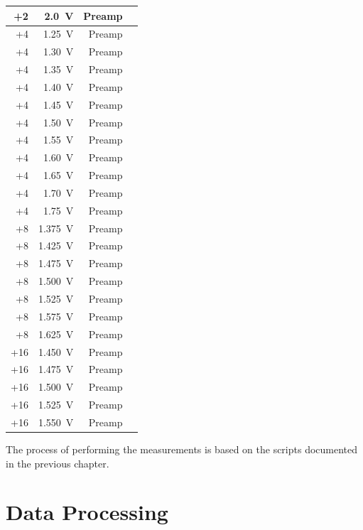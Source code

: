 \begin{table}
\begin{tabular}{rrrr}
        +2 & \SI{2.0}{\volt} & Preamp \\
        \midrule
        +4 & \SI{1.25}{\volt} & Preamp \\
        +4 & \SI{1.30}{\volt} & Preamp \\
        +4 & \SI{1.35}{\volt} & Preamp \\
        +4 & \SI{1.40}{\volt} & Preamp \\
        +4 & \SI{1.45}{\volt} & Preamp \\
        +4 & \SI{1.50}{\volt} & Preamp \\
        +4 & \SI{1.55}{\volt} & Preamp \\
        +4 & \SI{1.60}{\volt} & Preamp \\
        +4 & \SI{1.65}{\volt} & Preamp \\
        +4 & \SI{1.70}{\volt} & Preamp \\
        +4 & \SI{1.75}{\volt} & Preamp \\
        \midrule
        +8 & \SI{1.375}{\volt} & Preamp \\
        +8 & \SI{1.425}{\volt} & Preamp \\
        +8 & \SI{1.475}{\volt} & Preamp \\
        +8 & \SI{1.500}{\volt} & Preamp \\
        +8 & \SI{1.525}{\volt} & Preamp \\
        +8 & \SI{1.575}{\volt} & Preamp \\
        +8 & \SI{1.625}{\volt} & Preamp \\
        \midrule
        +16 & \SI{1.450}{\volt} & Preamp \\
        +16 & \SI{1.475}{\volt} & Preamp \\
        +16 & \SI{1.500}{\volt} & Preamp \\
        +16 & \SI{1.525}{\volt} & Preamp \\
        +16 & \SI{1.550}{\volt} & Preamp \\
        \bottomrule
    \end{tabular}
\end{table}

The process of performing the measurements  is based on the scripts documented
in the previous chapter.


\section{Data Processing}
\label{sec:dataProcessing}


